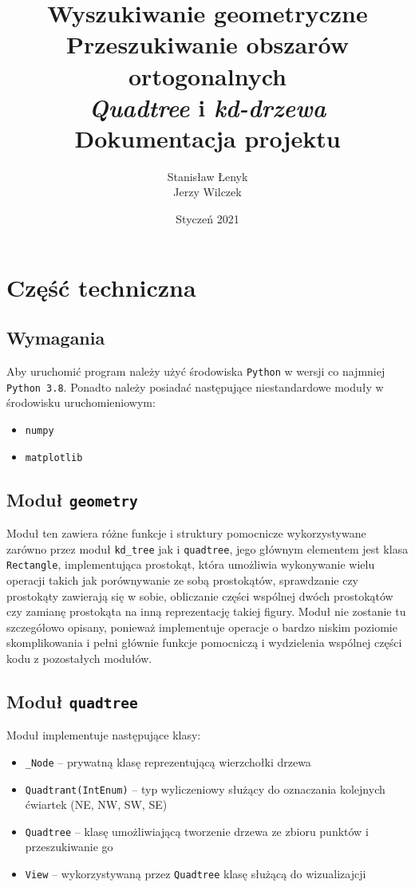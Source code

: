 \documentclass{article}
\title{\textbf{Wyszukiwanie geometryczne} \\ \textbf{Przeszukiwanie obszarów ortogonalnych} \\ \textit{Quadtree} i \textit{kd-drzewa} \\ Dokumentacja projektu}
\author{Stanisław Łenyk \\ Jerzy Wilczek}
\date{Styczeń 2021}
\begin{document}
\maketitle

\newpage

\tableofcontents

\newpage

\section{Część techniczna}

\subsection{Wymagania}

Aby uruchomić program należy użyć środowiska \texttt{Python} w wersji co najmniej \texttt{Python 3.8}. Ponadto należy posiadać następujące niestandardowe moduły w środowisku uruchomieniowym:

\begin{itemize}
    \item \texttt{numpy}
    \item \texttt{matplotlib}
\end{itemize}

\subsection{Moduł \texttt{geometry}}
\label{geometry}

Moduł ten zawiera różne funkcje i struktury pomocnicze wykorzystywane zarówno przez moduł \texttt{kd\_tree} jak i \texttt{quadtree}, jego głównym elementem jest klasa \texttt{Rectangle}, implementująca prostokąt, która umożliwia wykonywanie wielu operacji takich jak porównywanie ze sobą prostokątów, sprawdzanie czy prostokąty zawierają się w sobie, obliczanie części wspólnej dwóch prostokątów czy zamianę prostokąta na inną reprezentację takiej figury. Moduł nie zostanie tu szczegółowo opisany, ponieważ implementuje operacje o bardzo niskim poziomie skomplikowania i pełni głównie funkcje pomocniczą i wydzielenia wspólnej części kodu z pozostałych modułów.

\subsection{Moduł \texttt{quadtree}}



Moduł implementuje następujące klasy:
\begin{itemize}
    \item \texttt{\_Node} -- prywatną klasę reprezentującą wierzchołki drzewa
    \item \texttt{Quadtrant(IntEnum)} -- typ wyliczeniowy służący do oznaczania kolejnych ćwiartek (NE, NW, SW, SE)
    \item \texttt{Quadtree} -- klasę umożliwiającą tworzenie drzewa ze zbioru punktów i przeszukiwanie go
    \item \texttt{View} -- wykorzystywaną przez \texttt{Quadtree} klasę służącą do wizualizajcji
\end{itemize}
\end{document}

